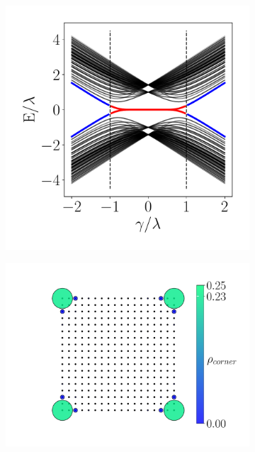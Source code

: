 \begin{figure}[h!]
     \centering
    \captionsetup[sub]{font=small}
     \begin{subfigure}[b!]{0.44 \textwidth}
         \caption{}
         \includegraphics[width=\textwidth]{Imagenes/Resultados_Hoti_Cuadrado/bands_square_shh.pdf}
     \end{subfigure}\hspace*{1em}
     \begin{subfigure}[b!]{0.56 \textwidth}
         \caption{}
         \includegraphics[width=\textwidth]{Imagenes/Resultados_Hoti_Cuadrado/proyection_square.pdf}

\end{subfigure}
\end{figure}
